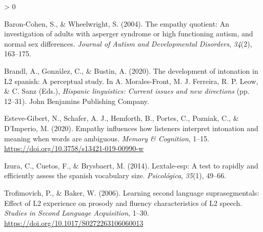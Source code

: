 \documentclass[
  12pt,
]{article}
\newlength{\cslhangindent}
\newenvironment{CSLReferences}[2] %
 {%
  \setlength{\parindent}{0pt}
  \ifodd #1 \everypar{\setlength{\hangindent}{\cslhangindent}}\ignorespaces\fi
  \ifnum #2 > 0
  \setlength{\parskip}{#2\baselineskip}
  \fi
 }%
 {}
\begin{document}
\hypertarget{refs}{}
\begin{CSLReferences}{1}{0}
\leavevmode\hypertarget{ref-baron2004empathy}{}%
Baron-Cohen, S., \& Wheelwright, S. (2004). The empathy quotient: An
investigation of adults with asperger syndrome or high functioning
autism, and normal sex differences. \emph{Journal of Autism and
Developmental Disorders}, \emph{34}(2), 163--175.

\leavevmode\hypertarget{ref-bustin_2020}{}%
Brandl, A., González, C., \& Bustin, A. (2020). The development of
intonation in L2 spanish: A perceptual study. In A. Morales-Front, M. J.
Ferreira, R. P. Leow, \& C. Sanz (Eds.), \emph{Hispanic linguistics:
Current issues and new directions} (pp. 12--31). John Benjamins
Publishing Company.

\leavevmode\hypertarget{ref-esteve2020empathy}{}%
Esteve-Gibert, N., Schafer, A. J., Hemforth, B., Portes, C., Pozniak,
C., \& D'Imperio, M. (2020). Empathy influences how listeners interpret
intonation and meaning when words are ambiguous. \emph{Memory \&
Cognition}, 1--15. \url{https://doi.org/10.3758/s13421-019-00990-w}

\leavevmode\hypertarget{ref-izura2014lextale}{}%
Izura, C., Cuetos, F., \& Brysbaert, M. (2014). Lextale-esp: A test to
rapidly and efficiently assess the spanish vocabulary size.
\emph{Psicol{ó}gica}, \emph{35}(1), 49--66.

\leavevmode\hypertarget{ref-trofimovich2006learning}{}%
Trofimovich, P., \& Baker, W. (2006). Learning second language
suprasegmentals: Effect of L2 experience on prosody and fluency
characteristics of L2 speech. \emph{Studies in Second Language
Acquisition}, 1--30. \url{https://doi.org/10.1017/S0272263106060013}

\end{CSLReferences}

\endgroup
\end{document}
